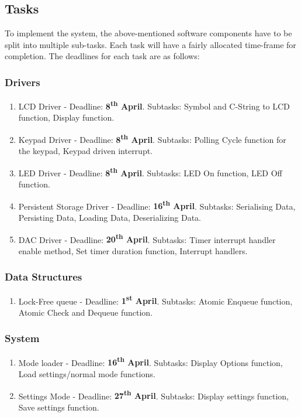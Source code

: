 \documentclass[11pt,a4paper,twocolumn]{scrartcl}
\begin{document}
\subsection{Tasks}
To implement the system, the above-mentioned software components have to be split into multiple sub-tasks. Each task will have a fairly allocated time-frame for completion. The deadlines for each task are as follows:
\subsubsection{Drivers}
\begin{enumerate}
    \item LCD Driver - Deadline: \textbf{8\textsuperscript{th} April}. Subtasks: Symbol and C-String to LCD function, Display function.
    \item Keypad Driver - Deadline: \textbf{8\textsuperscript{th} April}. Subtasks: Polling Cycle function for the keypad, Keypad driven interrupt.
    \item LED Driver - Deadline: \textbf{8\textsuperscript{th} April}. Subtasks: LED On function, LED Off function.
    \item Persistent Storage Driver - Deadline: \textbf{16\textsuperscript{th} April}. Subtasks: Serialising Data, Persisting Data, Loading Data, Deserializing Data.
    \item DAC Driver - Deadline: \textbf{20\textsuperscript{th} April}. Subtasks: Timer interrupt handler enable method, Set timer duration function, Interrupt handlers.
\end{enumerate}

\subsubsection{Data Structures}
\begin{enumerate}
    \item Lock-Free queue - Deadline: \textbf{1\textsuperscript{st} April}. Subtasks: Atomic Enqueue function, Atomic Check and Dequeue function.
\end{enumerate}

\subsubsection{System}
\begin{enumerate}
    \item Mode loader - Deadline: \textbf{16\textsuperscript{th} April}. Subtasks: Display Options function, Load settings/normal mode functions.
    \item Settings Mode - Deadline: \textbf{27\textsuperscript{th} April}. Subtasks: Display settings function, Save settings function.
\end{enumerate}
\end{document}
